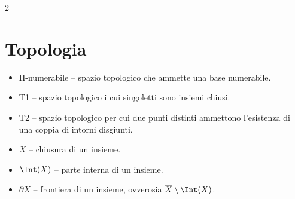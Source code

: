 \begin{multicols*}{2}
      \section*{Topologia}

      \begin{itemize}
            \item II-numerabile -- spazio topologico che ammette una base numerabile.
            \item T1 -- spazio topologico i cui singoletti sono insiemi chiusi.
            \item T2 -- spazio topologico per cui due punti distinti ammettono l'esistenza di una coppia di intorni disgiunti.
            \item $\overline{X}$ -- chiusura di un insieme.
            \item $\Int(X)$ -- parte interna di un insieme.
            \item $\partial X$ -- frontiera di un insieme, ovverosia $\overline{X} \setminus \Int(X)$.
      \end{itemize}
\end{multicols*}
